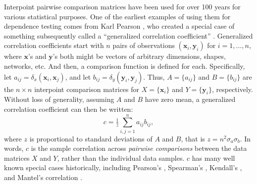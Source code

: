 \documentclass[11pt]{article}
\providecommand{\sct}[1]{{\normalfont\textsc{#1}}}
\providecommand{\mb}[1]{\boldsymbol{#1}}
\newcommand{\G}{c}
\newcommand{\Mgc}{\sct{Mgc}}
\newcommand{\Mantel}{\sct{Mantel}}
\begin{document}

Interpoint pairwise comparison matrices have been used for over 100 years for various statistical purposes. %
% 
One of the earliest examples of using them for dependence testing comes from  Karl Pearson \cite{Pearson1895}, who created  a special case of something subsequently called a ``generalized correlation coefficient'' \cite{KendallBook}.
Generalized correlation coefficients start with $n$ pairs of observations $(\mb{x}_i,\mb{y}_i)$ for $i=1,\ldots,n$, where $\mb{x}$'s and $\mb{y}$'s both might be vectors of arbitrary dimensions, shapes, networks, etc.  And then, a comparison function is defined for each.  Specifically, let $a_{ij}=\delta_x(\mb{x}_i,\mb{x}_j)$, and let $b_{ij}=\delta_y(\mb{y}_i,\mb{y}_j)$.  
Thus, $A=\{a_{ij}\}$ and $B=\{b_{ij}\}$ are the $n \times n$ interpoint comparison matrices for $X=\{\mb{x}_{i}\}$ and $Y=\{\mb{y}_{i}\}$, respectively.  
Without loss of generality, assuming $A$ and $B$ have zero mean, a generalized correlation coefficient can then be written:
\begin{equation}
\label{generalCoef}
\G= \tfrac{1}{z} {\textstyle \sum_{i,j=1}^n a_{ij} b_{ij}},
\end{equation}
where $z$ is proportional to standard deviations of $A$ and $B$, that is $z=n^2\sigma_a \sigma_b$.
In words, $\G$ is the sample correlation across \emph{pairwise comparisons} between the data matrices $X$ and $Y$, rather than the individual data samples.  
$\G$ has many well known special cases historically, including Pearson's  \cite{Pearson1895}, Spearman's \cite{Spearman1904},  Kendall's \cite{KendallBook}, and Mantel's correlation \cite{Mantel1967}. %
\end{document}

